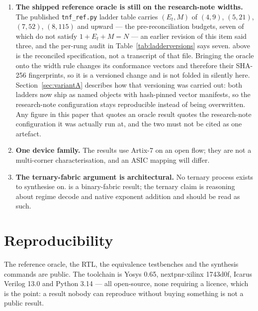 \begin{enumerate}[leftmargin=*]
\item \textbf{The shipped reference oracle is still on the research-note widths.}
The published \texttt{tnf\_ref.py} ladder table carries $(E_t,M)$ of
$(4,9)$, $(5,21)$, $(7,52)$, $(8,115)$ and upward --- the pre-reconciliation
budgets, seven of which do not satisfy $1+E_t+M=N$ --- an earlier revision of this
item said three, and the per-rung audit in Table~\ref{tab:ladderversions} says
seven.  above is
the reconciled specification, not a transcript of that file. Bringing the oracle
onto the width rule changes its conformance vectors and therefore their SHA-256
fingerprints, so it is a versioned change and is not folded in silently here.
Section~\ref{sec:variantA} describes how that versioning was carried out: both
ladders now ship as named objects with hash-pinned vector manifests, so the
research-note configuration stays reproducible instead of being overwritten. Any
figure in this paper that quotes an oracle result quotes the research-note
configuration it was actually run at, and the two must not be cited as one
artefact.

\item \textbf{One device family.} The results use Artix-7 on an open flow; they
are not a multi-corner characterisation, and an ASIC mapping will differ.

\item \textbf{The ternary-fabric argument is architectural.} No ternary process
exists to synthesise on.  is a binary-fabric result;
the ternary claim is reasoning about regime decode and native exponent addition
and should be read as such.
\end{enumerate}



\section*{Reproducibility}

The reference oracle, the RTL, the equivalence testbenches and the synthesis
commands are public. The toolchain is Yosys 0.65, nextpnr-xilinx 1743d0f,
Icarus Verilog 13.0 and Python 3.14 --- all open-source, none requiring a
licence, which is the point: a result nobody can reproduce without buying
something is not a public result.


